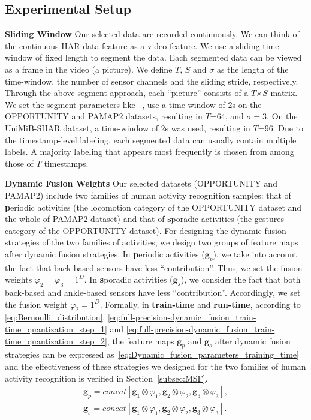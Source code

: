 \documentclass[twoside,twocolumn]{article}
\begin{document}
\subsection{Experimental Setup}\label{sec:Experimental_Setup}
\noindent\textbf{Sliding Window} Our selected data are recorded continuously. We can think of the continuous-HAR data feature as a video feature. We use a sliding time-window of fixed length to segment the data. Each segmented data can be viewed as a frame in the video (a picture). We define $T$, $S$ and $\sigma$ as the length of the time-window, the number of sensor channels and the sliding stride, respectively. Through the above segment approach, each ``picture'' consists of a $T$$\times$$S$ matrix. We set the segment parameters like ~\cite{b44}, use a time-window of 2s on the OPPORTUNITY and PAMAP2 datasets, resulting in $T$=64, and $\sigma=3$. On the UniMiB-SHAR dataset, a time-window of 2s was used, resulting in $T$=96. Due to the timestamp-level labeling, each segmented data can usually contain multiple labels. A majority labeling that appears most frequently is chosen from among those of $T$ timestamps.

\noindent\textbf{Dynamic Fusion Weights} Our selected datasets (OPPORTUNITY and PAMAP2) include two families of human activity recognition samples: that of \textbf{p}eriodic activities (the locomotion category of the OPPORTUNITY dataset and the whole of PAMAP2 dataset) and that of \textbf{s}poradic activities (the gestures category of the OPPORTUNITY dataset). For designing the dynamic fusion strategies of the two families of activities, we design two groups of feature maps after dynamic fusion strategies. In \textbf{p}eriodic activities ($\boldsymbol{g}_p$), we take into account the fact that back-based sensors have less ``contribution''. Thus, we set the fusion weights $\varphi_2=\varphi_3=1^D$. In \textbf{s}poradic activities ($\boldsymbol{g}_s$), we consider the fact that both back-based and ankle-based sensors have less ``contribution''. Accordingly, we set the fusion weight $\varphi_2=1^D$. Formally, in \textbf{train-time} and \textbf{run-time}, according to \eqref{eq:Bernoulli_distribution}, \eqref{eq:full-precision-dynamic_fusion_train-time_quantization_step_1} and \eqref{eq:full-precision-dynamic_fusion_train-time_quantization_step_2}, the feature maps $\boldsymbol{g}_p$ and $\boldsymbol{g}_s$ after dynamic fusion strategies can be expressed as~\eqref{eq:Dynamic_fusion_parameters_training_time} and the effectiveness of these strategies we designed for the two families of human activity recognition is verified in Section~\ref{subsec:MSF}.
\begin{equation}\label{eq:Dynamic_fusion_parameters_training_time}
\begin{split}
\boldsymbol{g}_p=concat\left[ \boldsymbol{g}_1\otimes \varphi_1,\boldsymbol{g}_2\otimes \varphi_2, \boldsymbol{g}_3\otimes \varphi_3 \right],
\\
\boldsymbol{g}_s=concat\left[ \boldsymbol{g}_1\otimes \varphi_1,\boldsymbol{g}_2\otimes \varphi_2, \boldsymbol{g}_3\otimes \varphi_3 \right].
\end{split}
\end{equation}
\end{document}
